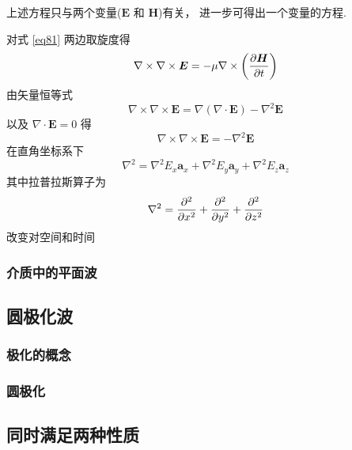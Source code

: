\documentclass[UTF8,linespread=1.236]{ctexart}
\newcommand\cu[1]{\boldsymbol{#1}}
\newcommand\vecE{\cu{E}}
\newcommand\vecH{\cu{H}}
\newcommand\pypx[2]{{{\partial {#1}} \over {\partial {#2}}}}
\begin{document}
上述方程只与两个变量($\vecE$ 和 $\vecH$)有关，
进一步可得出一个变量的方程.

对式 \ref{eq81} 两边取旋度得
\begin{equation}
    \nabla \times \nabla \times \vecE
    =
    - \mu \nabla \times \left( \pypx{\vecH}{t} \right)
\end{equation}
由矢量恒等式
\begin{equation}
    \nabla \times \nabla \times \vecE
    =
    \nabla(\nabla \cdot \vecE)
    -
    \nabla^2\vecE
\end{equation}
以及 $\nabla \cdot \vecE = 0$ 得
\begin{equation}
    \nabla \times \nabla \times \vecE = - \nabla^2\vecE
\end{equation}
在直角坐标系下
\begin{equation}
    \nabla^2 =
    \nabla^2E_x\cu{a}_x +
    \nabla^2E_y\cu{a}_y +
    \nabla^2E_z\cu{a}_z
\end{equation}
其中拉普拉斯算子为
\begin{equation}
    \nabla^2 = \pypx{^2}{x^2} + \pypx{^2}{y^2} + \pypx{^2}{z^2}
\end{equation}
改变对空间和时间

\subsubsection{介质中的平面波}

\subsection{圆极化波}

\subsubsection{极化的概念}

\subsubsection{圆极化}

\subsection{同时满足两种性质}


\end{document}
